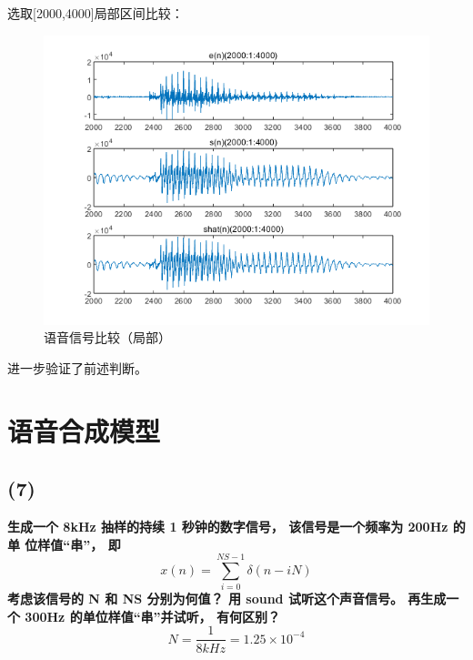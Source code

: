 \documentclass[10pt]{article}
\begin{document}
选取[2000,4000]局部区间比较：
\begin{figure}[h]
	\centering
	\begin{minipage}{0.49\linewidth}
		\centering
		\includegraphics[width=0.9\linewidth]{commpare.png}
		\caption{语音信号比较（局部）}
	\end{minipage}
\end{figure}
进一步验证了前述判断。
\section{语音合成模型}
\subsection*{(7)}
\textbf{生成一个 8kHz 抽样的持续 1 秒钟的数字信号， 该信号是一个频率为 200Hz 的单
位样值“串”， 即$$x(n)=\sum_{i=0}^{NS-1}\delta(n-iN)$$考虑该信号的 N 和 NS 分别为何值？ 
用 sound 试听这个声音信号。 再生成一个 300Hz 的单位样值“串”并试听， 有何区别？ }
$$N=\frac{1}{8kHz}=1.25\times10^{-4}$$
\end{document}
